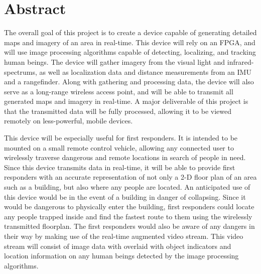 {}
\section*{Abstract}
The overall goal of this project is to create a device capable of generating detailed maps and imagery of an area in real-time. This device will rely on an FPGA, and will use image processing algorithms capable of detecting, localizing, and tracking human beings. The device will gather imagery from the visual light and infrared-spectrums, as well as localization data and distance measurements from an IMU and a rangefinder. Along with gathering and processing data, the device will also serve as a long-range wireless access point, and will be able to transmit all generated maps and imagery in real-time. A major deliverable of this project is that the transmitted data will be fully processed, allowing it to be viewed remotely on less-powerful, mobile devices.
\par
This device will be especially useful for first responders. It is intended to be mounted on a small remote control vehicle, allowing any connected user to wirelessly traverse dangerous and remote locations in search of people in need. Since this device transmits data in real-time, it will be able to provide first responders with an accurate representation of not only a 2-D floor plan of an area such as a building, but also where any people are located. An anticipated use of this device would be in the event of a building in danger of collapsing. Since it would be dangerous to physically enter the building, first responders could locate any people trapped inside and find the fastest route to them using the wirelessly transmitted floorplan. The first responders would also be aware of any dangers in their way by making use of the real-time augmented video stream. This video stream will consist of image data with overlaid with object indicators and location information on any human beings detected by the image processing algorithms.
 
